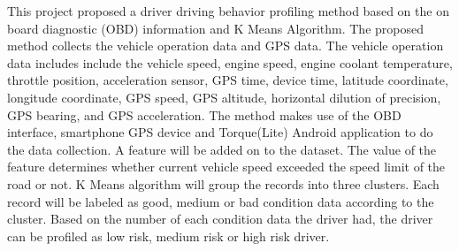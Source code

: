 
This project proposed a driver driving behavior profiling method based on the on board diagnostic (OBD) information and K Means Algorithm. The proposed method collects the vehicle operation data and GPS data. The vehicle operation data includes include the vehicle speed, engine speed, engine coolant temperature, throttle position, acceleration sensor, GPS time, device time, latitude coordinate, longitude coordinate, GPS speed, GPS altitude, horizontal dilution of precision, GPS bearing, and GPS acceleration. The method makes use of the OBD interface, smartphone GPS device and Torque(Lite) Android application to do the data collection. A feature will be added on to the dataset. The value of the feature determines whether current vehicle speed exceeded the speed limit of the road or not. K Means algorithm will group the records into three clusters. Each record will be labeled as good, medium or bad condition data according to the cluster. Based on the number of each condition data the driver had, the driver can be profiled as low risk, medium risk or high risk driver.